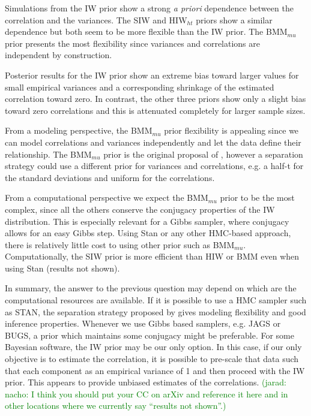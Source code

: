 \documentclass[12pt]{article}
\newcommand{\jarad}[1]{\textcolor{green}{(jarad: #1)}}
\begin{document}
Simulations from the IW prior show a strong \emph{a priori} dependence between the correlation and the variances. The SIW and HIW$_{ht}$ priors show a similar dependence but both seem to be more flexible than the IW prior. The BMM$_{mu}$ prior presents the most flexibility since variances and correlations are independent by construction.

Posterior results for the IW prior show an extreme bias toward larger values for small empirical variances and a corresponding shrinkage of the estimated correlation toward zero. In contrast, the other three priors show only a slight bias toward zero correlations and this is attenuated completely for larger sample sizes.

From a modeling perspective, the BMM$_{mu}$ prior flexibility is appealing since we can model correlations and variances independently and let the data define their relationship.  The BMM$_{mu}$ prior is the original proposal of \cite{barnard2000}, however a separation strategy could use a different prior for variances and correlations, e.g. a half-t for the standard deviations and uniform for the correlations. 

From a computational perspective we expect the BMM$_{mu}$ prior to be the most complex, since all the others conserve the conjugacy properties of the IW distribution. This is especially relevant for a Gibbs sampler, where conjugacy allows for an easy Gibbs step. Using Stan or any other HMC-based approach, there is relatively little cost to using other prior such as BMM$_{mu}$. 
Computationally, the SIW prior is more efficient than HIW or BMM even when using Stan (results not shown). 

In summary, the answer to the previous question may depend on which are the computational resources are available. If it is possible to use a HMC sampler such as STAN, the separation strategy proposed by \cite{barnard2000} gives modeling flexibility and good inference properties. Whenever we use Gibbs based samplers, e.g. JAGS or BUGS, a prior which maintains some conjugacy might be preferable. For some Bayesian software, the IW prior may be our only option. In this case, if our only objective is to estimate the correlation, it is possible to pre-scale that data such that each component as an empirical variance of 1 and then proceed with the IW prior. This appears to provide unbiased estimates of the correlations. \jarad{nacho: I think you should put your CC on arXiv and reference it here and in other locations where we currently say ``results not shown''.}
\end{document}
